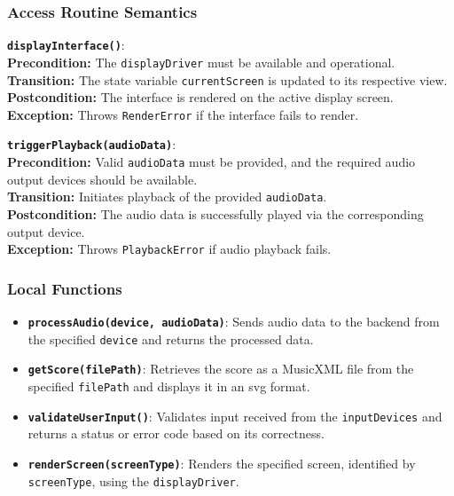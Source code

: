 \documentclass[12pt, titlepage]{article}
\begin{document}
\subsubsection{Access Routine Semantics}

\noindent \textbf{\texttt{displayInterface()}}: \\
\textbf{Precondition:} The \texttt{displayDriver} must be available and operational. \\
\textbf{Transition:} The state variable \texttt{currentScreen} is updated to its respective view. \\
\textbf{Postcondition:} The interface is rendered on the active display screen. \\
\textbf{Exception:} Throws \texttt{RenderError} if the interface fails to render.

\vspace{2mm}
\noindent \textbf{\texttt{triggerPlayback(audioData)}}: \\
\textbf{Precondition:} Valid \texttt{audioData} must be provided, and the required audio output devices should be available. \\
\textbf{Transition:} Initiates playback of the provided \texttt{audioData}. \\
\textbf{Postcondition:} The audio data is successfully played via the corresponding output device. \\
\textbf{Exception:} Throws \texttt{PlaybackError} if audio playback fails.

\subsubsection{Local Functions}
\begin{itemize}
    \item \textbf{\texttt{processAudio(device, audioData)}}: Sends audio data to the backend from the specified \texttt{device} and returns the processed data.
    \item \textbf{\texttt{getScore(filePath)}}: Retrieves the score as a MusicXML file from the specified \texttt{filePath} and displays it in an svg format.
    \item \textbf{\texttt{validateUserInput()}}: Validates input received from the \texttt{inputDevices} and returns a status or error code based on its correctness.
    \item \textbf{\texttt{renderScreen(screenType)}}: Renders the specified screen, identified by \texttt{screenType}, using the \texttt{displayDriver}.
\end{itemize}
\end{document}
